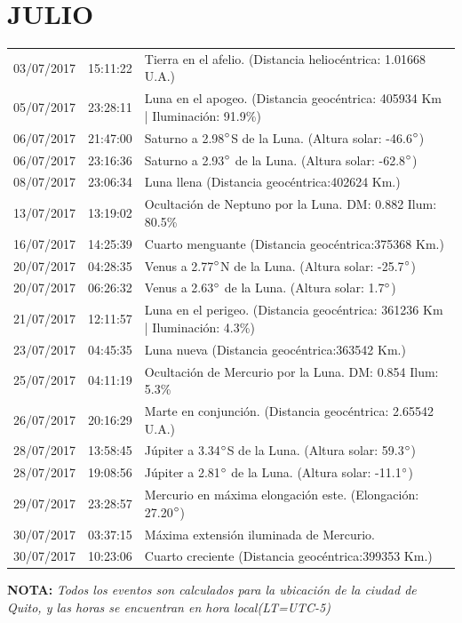 \documentclass[12pt,a4paper,oneside]{article}
\begin{document}
\section{JULIO}
\begin{center}
\begin{tabular}{ |l| l| l| }
\hline
03/07/2017& 15:11:22 &	Tierra en el afelio. (Distancia heliocéntrica: 1.01668 U.A.)	\\
05/07/2017& 23:28:11 &	Luna en el apogeo. (Distancia geocéntrica: 405934 Km | Iluminación: 91.9\%)	\\
06/07/2017& 21:47:00 &	Saturno a 2.98$\degree $S de la Luna. (Altura solar: -46.6$\degree $)	\\
06/07/2017& 23:16:36 &	Saturno a 2.93$\degree $ de la Luna. (Altura solar: -62.8$\degree $)	\\
08/07/2017& 23:06:34 &	Luna llena (Distancia geocéntrica:402624 Km.)	\\
13/07/2017& 13:19:02 &	Ocultación de Neptuno por la Luna. DM: 0.882 Ilum: 80.5\%	\\
16/07/2017& 14:25:39 &	Cuarto menguante (Distancia geocéntrica:375368 Km.)	\\
20/07/2017& 04:28:35 &	Venus a 2.77$\degree $N de la Luna. (Altura solar: -25.7$\degree $)	\\
20/07/2017& 06:26:32 &	Venus a 2.63$\degree $ de la Luna. (Altura solar: 1.7$\degree $)	\\
21/07/2017& 12:11:57 &	Luna en el perigeo. (Distancia geocéntrica: 361236 Km | Iluminación: 4.3\%)	\\
23/07/2017& 04:45:35 &	Luna nueva (Distancia geocéntrica:363542 Km.)	\\
25/07/2017& 04:11:19 &	Ocultación de Mercurio por la Luna. DM: 0.854 Ilum: 5.3\% \\
26/07/2017& 20:16:29 &	Marte en conjunción. (Distancia geocéntrica: 2.65542 U.A.)	\\
28/07/2017& 13:58:45 &	Júpiter a 3.34$\degree $S de la Luna. (Altura solar: 59.3$\degree $)	\\
28/07/2017& 19:08:56 &	Júpiter a 2.81$\degree $ de la Luna. (Altura solar: -11.1$\degree $)	\\
29/07/2017& 23:28:57 &	Mercurio en máxima elongación este. (Elongación: 27.20$\degree $)	\\
30/07/2017& 03:37:15 &	Máxima extensión iluminada de Mercurio.	\\
30/07/2017& 10:23:06 &	Cuarto creciente (Distancia geocéntrica:399353 Km.)	\\
\hline
\end{tabular}
\end{center}
\vspace{1cm}
\textbf{NOTA:  }\textit{Todos los eventos son calculados para la ubicaci\'on de la ciudad de Quito, y las horas se encuentran en hora local(LT=UTC-5)}
\vspace{0.7cm}
\newpage
\end{document}

